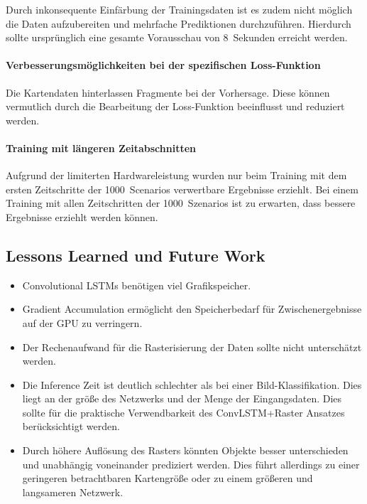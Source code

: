 \documentclass[12pt]{article}
\begin{document}
    Durch inkonsequente Einfärbung der Trainingsdaten ist es zudem nicht möglich die Daten aufzubereiten und mehrfache Prediktionen durchzuführen.
    Hierdurch sollte ursprünglich eine gesamte Vorausschau von 8~Sekunden erreicht werden.

    \paragraph{Verbesserungsmöglichkeiten bei der spezifischen Loss-Funktion} Die Kartendaten hinterlassen Fragmente bei der Vorhersage. 
    Diese können vermutlich durch die Bearbeitung der Loss-Funktion beeinflusst und reduziert werden.
    \paragraph{Training mit längeren Zeitabschnitten} Aufgrund der limiterten Hardwareleistung wurden nur beim Training mit dem ersten 
    Zeitschritte der 1000~Scenarios verwertbare Ergebnisse erziehlt. Bei einem Training mit allen Zeitschritten der 1000~Szenarios ist zu erwarten, 
    dass bessere Ergebnisse erziehlt werden können.

    \subsection{Lessons Learned und Future Work}
        \begin{itemize}
            \item Convolutional LSTMs benötigen viel Grafikspeicher.
            \item Gradient Accumulation ermöglicht den Speicherbedarf für Zwischenergebnisse auf der GPU zu verringern.
            \item Der Rechenaufwand für die Rasterisierung der Daten sollte nicht unterschätzt werden.
            \item Die Inference Zeit ist deutlich schlechter als bei einer Bild-Klassifikation. Dies liegt an der größe des Netzwerks und der Menge der Eingangsdaten. Dies sollte für die praktische Verwendbarkeit des ConvLSTM+Raster Ansatzes berücksichtigt werden. 
            \item Durch höhere Auflösung des Rasters könnten Objekte besser unterschieden und unabhängig voneinander prediziert werden. Dies führt allerdings zu einer geringeren betrachtbaren Kartengröße oder zu einem größeren und langsameren Netzwerk.
        \end{itemize}

{}

\end{document}
